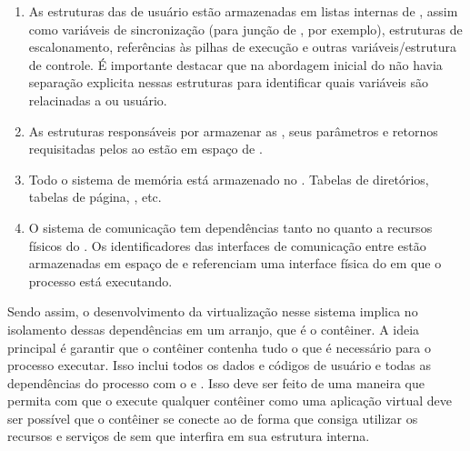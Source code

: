 \begin{enumerate}[label=(\roman*)]
    \item As estruturas das \threads de usuário estão armazenadas em listas internas de , assim como variáveis de sincronização (para junção de \threads, por exemplo), estruturas de escalonamento, referências às pilhas de execução e outras variáveis/estrutura de controle. É importante destacar que na abordagem inicial do \nanvix não havia separação explicita nessas estruturas para identificar quais variáveis são relacinadas a  ou usuário.
    \item As estruturas responsáveis por armazenar as \syscalls, seus parâmetros e retornos requisitadas pelos \scores ao \mcore estão em espaço de .
    \item Todo o sistema de memória está armazenado no . Tabelas de diretórios, tabelas de página, \tlb, etc.
    \item O sistema de comunicação tem dependências tanto no  quanto a recursos físicos do \cluster. Os identificadores das interfaces \noc \ie de comunicação entre \clusters estão armazenadas em espaço de  e referenciam uma interface física do \cluster em que o processo está executando.
\end{enumerate}

Sendo assim, o desenvolvimento da virtualização nesse sistema implica no isolamento dessas dependências em um arranjo, que é o contêiner. A ideia principal é garantir que o contêiner contenha tudo o que é necessário para o processo executar. Isso inclui todos os dados e códigos de usuário e todas as dependências do processo com o  e \cluster. Isso deve ser feito de uma maneira que permita com que o  execute qualquer contêiner como uma aplicação virtual \ie deve ser possível que o contêiner se conecte ao  de forma que consiga utilizar os recursos e serviços de  sem que interfira em sua estrutura interna.

